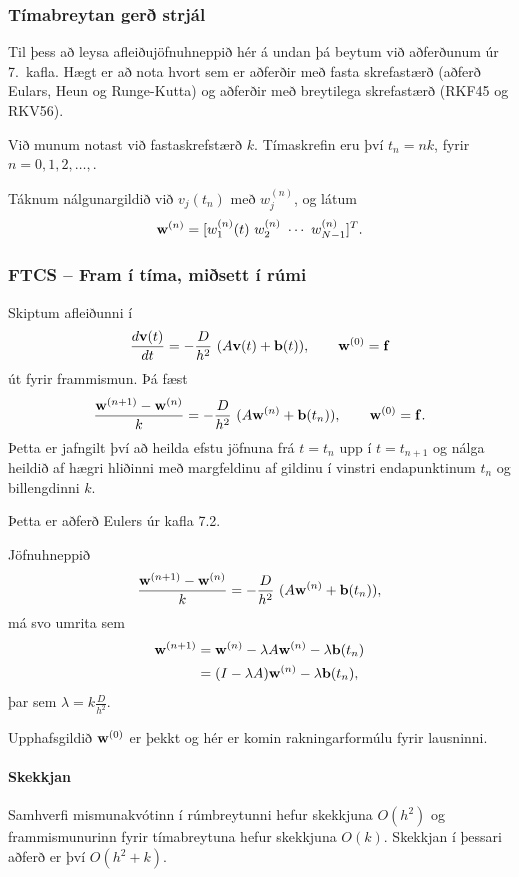 \documentclass[icelandic,a4paper,12pt]{article}
\begin{document}
\subsubsection{Tímabreytan gerð strjál}
Til þess að leysa afleiðujöfnuhneppið hér á undan þá beytum við aðferðunum
úr 7.~kafla. Hægt er að nota hvort sem er aðferðir með fasta skrefastærð
(aðferð Eulars, Heun og Runge-Kutta) og aðferðir með breytilega skrefastærð
(RKF45 og RKV56). \pause

\medskip
Við munum notast við fastaskrefstærð $k$. Tímaskrefin eru því
$t_n = n k$, fyrir $n=0,1,2,\ldots,$. \pause

\medskip
Táknum nálgunargildið við 
$v_j(t_n)$ með $w_j^{(n)}$, og látum
$$
  \wv^{(n)} = [w_1^{(n)}(t) \ w_2^{(n)} \ \cdots \ w_{N-1}^{(n)} ]^T. 
$$



\subsubsection{FTCS -- Fram í tíma, miðsett í rúmi}
Skiptum afleiðunni í 
$$ 
 \frac{d \mbox{${\bf v}$}(t)}{d t} =  -\frac{D}{h^2}\  (A\mbox{${\bf v}$}(t) + \mbox{${\bf b}$}(t)), \qquad \mbox{${\bf w}$}^{(0)}=\mbox{${\bf f}$}
$$
út fyrir frammismun. Þá fæst
$$ 
 \frac{\mbox{${\bf w}$}^{(n+1)} - \mbox{${\bf w}$}^{(n)}}{ k} =  -\frac{D}{h^2}\  (A\mbox{${\bf w}$}^{(n)} + \mbox{${\bf b}$}(t_n)), 
 \qquad \mbox{${\bf w}$}^{(0)}=\mbox{${\bf f}$}.
$$\pause
Þetta er jafngilt því að heilda efstu jöfnuna frá $t=t_n$ upp í $t=t_{n+1}$ og
nálga heildið af hægri hliðinni með margfeldinu af gildinu í vinstri endapunktinum 
$t_n$ og billengdinni $k$. \pause

Þetta er aðferð Eulers úr kafla 7.2.

 

 Jöfnuhneppið
 $$ 
 \frac{\mbox{${\bf w}$}^{(n+1)} - \mbox{${\bf w}$}^{(n)}}{ k} =  -\frac{D}{h^2}\  (A\mbox{${\bf w}$}^{(n)} + \mbox{${\bf b}$}(t_n)), 
$$
má svo umrita sem
\begin{align*}
 \mbox{${\bf w}$}^{(n+1)} &= \mbox{${\bf w}$}^{(n)} -\lambda A\mbox{${\bf w}$}^{(n)} - \lambda \mbox{${\bf b}$}(t_n) \\
 & = (I-\lambda A) \mbox{${\bf w}$}^{(n)} - \lambda \mbox{${\bf b}$}(t_n),
\end{align*}
þar sem $\lambda = k\frac{D}{h^2}$. \pause
 
 Upphafsgildið $\mbox{${\bf w}$}^{(0)}$ er þekkt og hér er komin rakningarformúlu
 fyrir lausninni.  \pause
 
 \paragraph{Skekkjan}
  Samhverfi mismunakvótinn í rúmbreytunni hefur skekkjuna
 $O(h^2)$ og frammismunurinn fyrir tímabreytuna hefur skekkjuna $O(k)$. 
 Skekkjan í þessari aðferð er því $O(h^2 + k)$.
 
\end{document}
